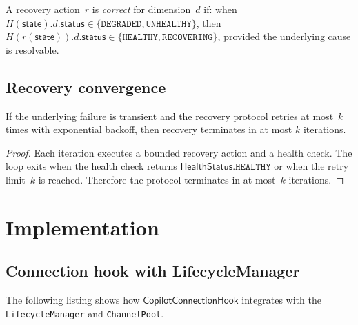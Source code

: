 \documentclass[11pt]{article}
\newcommand{\ConnHook}{\mathsf{CopilotConnectionHook}}
\newcommand{\HealthStat}{\mathsf{HealthStatus}}
\begin{document}
\begin{definition}\label{def:recovcorr}
A recovery action~$r$ is \emph{correct} for dimension~$d$
if: when $H(\mathsf{state}).d.\mathsf{status} \in
\{\texttt{DEGRADED}, \texttt{UNHEALTHY}\}$, then
$H(r(\mathsf{state})).d.\mathsf{status} \in
\{\texttt{HEALTHY}, \texttt{RECOVERING}\}$,
provided the underlying cause is resolvable.
\end{definition}

\subsection{Recovery convergence}

\begin{proposition}\label{prop:recovterm}
If the underlying failure is transient and the recovery
protocol retries at most~$k$ times with exponential
backoff, then recovery terminates in at most $k$ iterations.
\end{proposition}
\begin{proof}
Each iteration executes a bounded recovery action and
a health check.  The loop exits when the health check
returns $\HealthStat.\texttt{HEALTHY}$ or when the
retry limit~$k$ is reached.  Therefore the protocol
terminates in at most~$k$ iterations.
\end{proof}

\section{Implementation}\label{sec:code}

\subsection{Connection hook with LifecycleManager}

The following listing shows how $\ConnHook$ integrates
with the \texttt{LifecycleManager} and \texttt{ChannelPool}.
\end{document}
